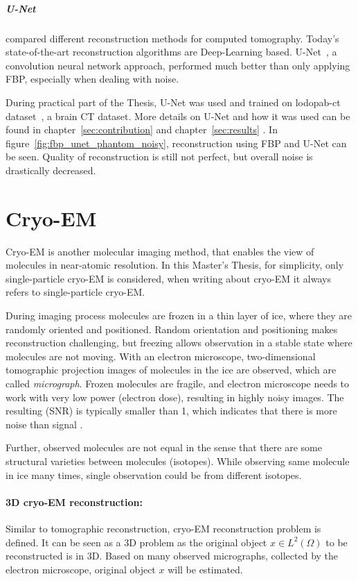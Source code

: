 \subparagraph{U-Net}
\citet{ct-reconstruction-comparison} compared different reconstruction methods for computed tomography. 
Today's state-of-the-art reconstruction algorithms are Deep-Learning based.
U-Net~\cite{unet-tomography}, a convolution neural network approach, performed
much better than only applying FBP, especially when dealing with noise.

During practical part of the Thesis, U-Net was used and trained on lodopab-ct dataset~\cite{lodopab-dataset}, a brain CT dataset. 
More details on U-Net and how it was used can be found in 
chapter~\ref{sec:contribution} \textit{} and 
chapter~\ref{sec:results} \textit{}.
In figure~\ref{fig:fbp_unet_phantom_noisy}, reconstruction using FBP and U-Net can be seen.
Quality of reconstruction is still not perfect, but overall noise is drastically decreased.


\section{Cryo-EM}
Cryo-EM is another molecular imaging method, that enables the view of molecules in near-atomic resolution.
In this Master's Thesis, for simplicity, only single-particle cryo-EM \cite{singleParticleCryoEm} is considered, 
when writing about cryo-EM it always refers to single-particle cryo-EM.

During imaging process molecules are frozen in a thin layer of ice, where they are randomly oriented and positioned. 
Random orientation and positioning makes reconstruction challenging, 
but freezing allows observation in a stable state where molecules are not moving.
With an electron microscope, two-dimensional tomographic projection images of molecules in the ice are observed,
which are called \textit{micrograph}. 
Frozen molecules are fragile, and electron microscope needs to work with
very low power (electron dose), resulting in highly noisy images. The resulting (SNR)
is typically smaller than 1, which indicates that there is more noise than signal \cite{cryoEmMath2}.

Further, observed molecules are not equal in the sense that there are some structural varieties between
molecules (isotopes). While observing same molecule in ice many times, single observation could be from different isotopes.

\paragraph{3D cryo-EM reconstruction:}
Similar to tomographic reconstruction, cryo-EM reconstruction problem \cite{cryoEmMath} is defined.
It can be seen as a 3D problem as the original object $x \in L^2(\Omega)$ to be reconstructed is in 3D.
Based on many observed micrographs, collected by the electron microscope, original object $x$ will be estimated.

